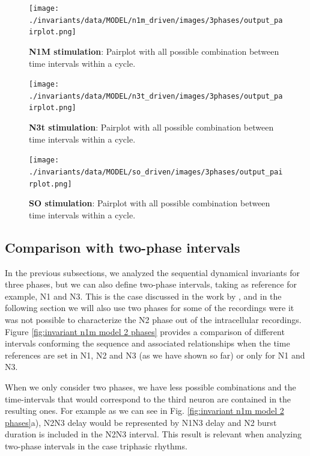 \begin{figure}[htbp]
	\centering
	\texttt{[image: ./invariants/data/MODEL/n1m\_driven/images/3phases/output\_pairplot.png]}
	\caption{\textbf{N1M stimulation}: Pairplot with all possible combination between time intervals within a cycle.}
	\label{fig:model n1m stimulation pairplot}
\end{figure}
 
\begin{figure}[htbp]
	\centering
	\texttt{[image: ./invariants/data/MODEL/n3t\_driven/images/3phases/output\_pairplot.png]}
	\caption{\textbf{N3t stimulation}: Pairplot with all possible combination between time intervals within a cycle.}
	\label{fig:model n3t stimulation pairplot}
\end{figure}

\begin{figure}[htbp]
	\centering
	\texttt{[image: ./invariants/data/MODEL/so\_driven/images/3phases/output\_pairplot.png]}
	\caption{\textbf{SO stimulation}: Pairplot with all possible combination between time intervals within a cycle.}
	\label{fig:model so stimulation pairplot}
\end{figure}

%
\subsection{Comparison with two-phase intervals}
In the previous subsections, we analyzed the sequential dynamical invariants for three phases, but we can also define two-phase intervals, taking as reference for example, N1 and N3. This is the case discussed in the work by \textcite{elices_robust_2019}, and in the following section we will also use two phases for some of the recordings were it was not possible to characterize the N2 phase out of the intracellular recordings. Figure \ref{fig:invariant n1m model 2 phases} provides a comparison of  different intervals conforming the sequence and associated relationships when the time references are set in N1, N2 and N3 (as we have shown so far) or only for N1 and N3.

When we only consider two phases, we have less possible combinations and the time-intervals that would correspond to the third neuron are contained in the resulting ones. For example as we can see in Fig. \ref{fig:invariant n1m model 2 phases}a), N2N3 delay would be represented by N1N3 delay and N2 burst duration is included in the N2N3 interval. This result is relevant when analyzing two-phase intervals in the case triphasic rhythms.

